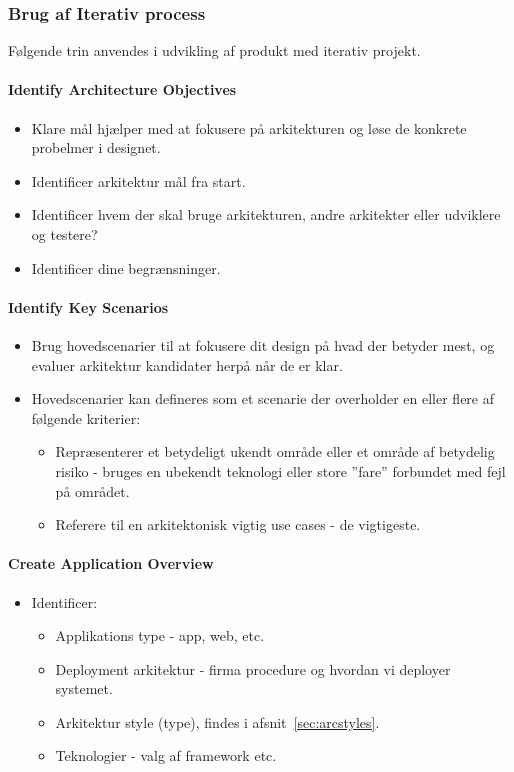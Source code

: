\subsubsection{Brug af Iterativ process}\label{sec:arc_ite}
Følgende trin anvendes i udvikling af produkt med iterativ projekt.

\paragraph{Identify Architecture Objectives}
\begin{itemize}
	\item Klare mål hjælper med at fokusere på arkitekturen og løse de konkrete probelmer i designet.
	\item Identificer arkitektur mål fra start.
	\item Identificer hvem der skal bruge arkitekturen, andre arkitekter eller udviklere og testere?
	\item Identificer dine begrænsninger.
\end{itemize}

\paragraph{Identify Key Scenarios}
\begin{itemize}
	\item Brug hovedscenarier til at fokusere dit design på hvad der betyder mest, og evaluer arkitektur kandidater herpå når de er klar.
	\item Hovedscenarier kan defineres som et scenarie der overholder en eller flere af følgende kriterier:
	\begin{itemize}
		\item Repræsenterer et betydeligt ukendt område eller et område af betydelig risiko - bruges en ubekendt teknologi eller store ''fare'' forbundet med fejl på området.
		\item Referere til en arkitektonisk vigtig use cases - de vigtigeste.
	\end{itemize}
\end{itemize}

\paragraph{Create Application Overview}
\begin{itemize}
	\item Identificer:
	\begin{itemize}
		\item Applikations type - app, web, etc.
		\item Deployment arkitektur - firma procedure og hvordan vi deployer systemet.
		\item Arkitektur style (type), findes i afsnit~\ref{sec:arcstyles}.
		\item Teknologier - valg af framework etc.
	\end{itemize}
\end{itemize}

